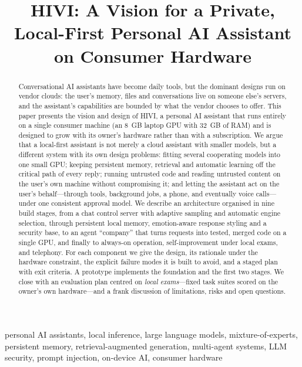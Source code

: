 \documentclass[conference]{IEEEtran}
\newcommand{\hivi}{HIVI}
\begin{document}
\title{\hivi{}: A Vision for a Private, Local-First Personal AI Assistant on Consumer Hardware}

\author{
}

\maketitle

\begin{abstract}
Conversational AI assistants have become daily tools, but the dominant designs run on vendor clouds: the user's memory, files and conversations live on someone else's servers, and the assistant's capabilities are bounded by what the vendor chooses to offer. This paper presents the vision and design of \hivi{}, a personal AI assistant that runs entirely on a single consumer machine (an 8~GB laptop GPU with 32~GB of RAM) and is designed to grow with its owner's hardware rather than with a subscription. We argue that a local-first assistant is not merely a cloud assistant with smaller models, but a different system with its own design problems: fitting several cooperating models into one small GPU; keeping persistent memory, retrieval and automatic learning off the critical path of every reply; running untrusted code and reading untrusted content on the user's own machine without compromising it; and letting the assistant act on the user's behalf---through tools, background jobs, a phone, and eventually voice calls---under one consistent approval model. We describe an architecture organised in nine build stages, from a chat control server with adaptive sampling and automatic engine selection, through persistent local memory, emotion-aware response styling and a security base, to an agent ``company'' that turns requests into tested, merged code on a single GPU, and finally to always-on operation, self-improvement under local exams, and telephony. For each component we give the design, its rationale under the hardware constraint, the explicit failure modes it is built to avoid, and a staged plan with exit criteria. A prototype implements the foundation and the first two stages. We close with an evaluation plan centred on \emph{local exams}---fixed task suites scored on the owner's own hardware---and a frank discussion of limitations, risks and open questions.
\end{abstract}

\begin{IEEEkeywords}
personal AI assistants, local inference, large language models, mixture-of-experts, persistent memory, retrieval-augmented generation, multi-agent systems, LLM security, prompt injection, on-device AI, consumer hardware
\end{IEEEkeywords}
\end{document}
